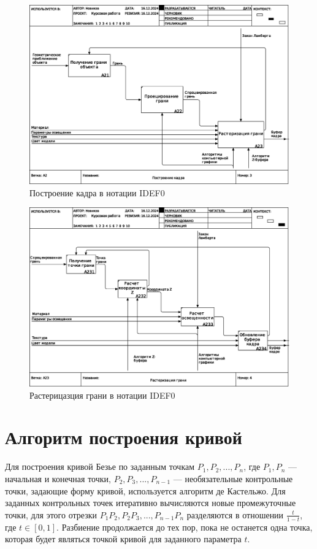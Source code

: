 \begin{figure}[H]
	\centering
	\includegraphics[scale=0.8]{img/03_A2.eps}
	\caption{Построение кадра в нотации IDEF0}
	\label{fig:viewer}
\end{figure}

\begin{figure}[H]
	\centering
	\includegraphics[scale=0.8]{img/04_A23.eps}
	\caption{Растерицазция грани в нотации IDEF0}
	\label{fig:viewer}
\end{figure}

\section{Алгоритм построения кривой}
Для построения кривой Безье по заданным точкам $P_1, P_2,..., P_n$, где $P_1, P_n$ --- начальная и конечная точки, $P_2, P_3, ..., P_{n-1}$ --- необязательные контрольные точки, задающие форму кривой, используется алгоритм де Кастельжо. Для заданных контрольных точек итеративно вычисляются новые промежуточные точки, для этого отрезки $P_1P_2, P_2P_3,...,P_{n-1}P_n$ разделяются в отношении $\frac{t}{1-t}$, где $t\in[0,1]$. Разбиение продолжается до тех пор, пока не останется одна точка, которая будет являться точкой кривой для заданного параметра $t$.

